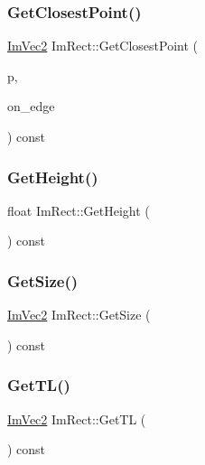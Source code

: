 \hypertarget{struct_im_rect_a223c67d4c93e5c87a33a68ebb527bbb8}{}\label{struct_im_rect_a223c67d4c93e5c87a33a68ebb527bbb8} 
\subsubsection{\texorpdfstring{Get\+Closest\+Point()}{GetClosestPoint()}}
{\footnotesize\ttfamily \hyperlink{struct_im_vec2}{Im\+Vec2} Im\+Rect\+::\+Get\+Closest\+Point (\begin{DoxyParamCaption}\item[{\hyperlink{struct_im_vec2}{Im\+Vec2}}]{p,  }\item[{bool}]{on\+\_\+edge }\end{DoxyParamCaption}) const}

\hypertarget{struct_im_rect_a748d8ae9cb26508951ec6e2f2df0625b}{}\label{struct_im_rect_a748d8ae9cb26508951ec6e2f2df0625b} 
\subsubsection{\texorpdfstring{Get\+Height()}{GetHeight()}}
{\footnotesize\ttfamily float Im\+Rect\+::\+Get\+Height (\begin{DoxyParamCaption}{ }\end{DoxyParamCaption}) const}

\hypertarget{struct_im_rect_ae459d9c50003058cfb34519a571aaf33}{}\label{struct_im_rect_ae459d9c50003058cfb34519a571aaf33} 
\subsubsection{\texorpdfstring{Get\+Size()}{GetSize()}}
{\footnotesize\ttfamily \hyperlink{struct_im_vec2}{Im\+Vec2} Im\+Rect\+::\+Get\+Size (\begin{DoxyParamCaption}{ }\end{DoxyParamCaption}) const}

\hypertarget{struct_im_rect_a1d4d972329722b51dca4499cb5931b4b}{}\label{struct_im_rect_a1d4d972329722b51dca4499cb5931b4b} 
\subsubsection{\texorpdfstring{Get\+T\+L()}{GetTL()}}
{\footnotesize\ttfamily \hyperlink{struct_im_vec2}{Im\+Vec2} Im\+Rect\+::\+Get\+TL (\begin{DoxyParamCaption}{ }\end{DoxyParamCaption}) const}

